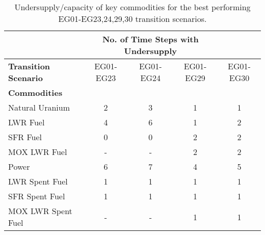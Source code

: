 \begin{table}[]
	\centering
        \caption{Undersupply/capacity of key commodities for the best performing EG01-EG23,24,29,30 transition scenarios.}
		\label{tab:all-power}
		\footnotesize
        \begin{tabular}{lcccc}
		\hline
		& \multicolumn{3}{c}{\textbf{No. of Time Steps with Undersupply}} \\ \hline
		\textbf{Transition Scenario} & EG01-EG23 & 
		EG01-EG24 & EG01-EG29 & EG01-EG30 \\ \hline 
		\textbf{Commodities} \\ 
		Natural Uranium		    & 2 	& 3  &  1  & 1 \\ 
		\gls{LWR} Fuel     	    & 4 	& 6  &  1  & 2\\ 
		\gls{SFR} Fuel     	    &  0 	& 0  &  2  & 2\\ 
		\gls{MOX} \gls{LWR} Fuel &-&-&2&2 \\
		Power      				&  6 	& 7  &  4 &  5\\ 
		\gls{LWR} Spent Fuel	& 1 	& 1  & 1 & 1\\ 
		\gls{SFR} Spent Fuel     	    &  1 	& 1  &  1  & 1\\ 
		\gls{MOX} \gls{LWR} Spent Fuel &-&-&1&1 \\ \hline 
	\end{tabular}
\end{table}
